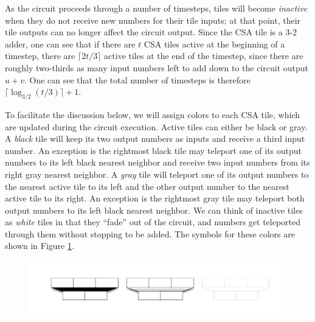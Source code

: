 \documentclass[twoside]{article}
\begin{document}
As the circuit proceeds through a number of timesteps,
tiles will become \emph{inactive} when they
do not receive new numbers for their tile inputs; at
that point, their tile outputs can no longer affect the circuit output.
Since the CSA tile is a 3-2 adder, one can see that if there are $t$ CSA tiles
active at the beginning of a timestep, there are $\lceil 2t/3 \rceil$ active
tiles at the end of the timestep, since there are roughly two-thirds as many
input numbers left to add down to the circuit output $u+v$. One can see that
the total number of timesteps
is therefore $\lceil \log_{3/2}(t/3) \rceil + 1$.

To facilitate the discussion below, we will assign colors to each CSA tile,
which are updated during the circuit execution. Active tiles can either be
black or gray.
A \emph{black} tile will keep its two output numbers as inputs and receive
a third input number. An exception is the rightmost black tile may teleport
one of its output numbers to its left black nearest neighbor and receive
two input numbers from its right gray nearest neighbor.
A \emph{gray} tile will teleport one of its output
numbers to the nearest active tile to its left and the other output number
to the nearest active tile to its right. An exception is the rightmost gray
tile may teleport both output numbers to its left black nearest neighbor.
We can think of inactive tiles as
\emph{white} tiles in that they ``fade'' out of the circuit, and numbers
get teleported through them without stopping to be added. The symbols for
these colors are shown in Figure \ref{fig:tile-colors}.

\begin{figure}[htb!]
\centerline{
\includegraphics[width=5.5in]{./csa-tile-colors.pdf}
}
\label{fig:tile-colors}
\end{figure}
\end{document}
